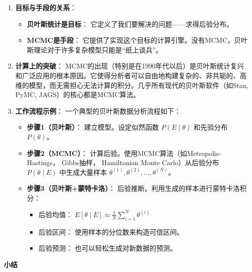 \documentclass[
]{book}
\providecommand{\tightlist}{%
  \setlength{\itemsep}{0pt}\setlength{\parskip}{0pt}}
\begin{document}
\begin{enumerate}
\def\labelenumi{\arabic{enumi}.}
\item
  \textbf{目标与手段的关系}：

  \begin{itemize}
  \tightlist
  \item
    \textbf{贝叶斯统计是目标}： 它定义了我们要解决的问题------求得后验分布。
  \item
    \textbf{MCMC是手段}： 它提供了实现这个目标的计算引擎。没有MCMC，贝叶斯理论对于许多复杂模型只能是``纸上谈兵''。
  \end{itemize}
\item
  \textbf{计算上的突破}：
  MCMC的出现（特别是在1990年代以后）是贝叶斯统计复兴和广泛应用的根本原因。它使得分析者可以自由地构建复杂的、非共轭的、高维的模型，而无需担心无法计算的积分。几乎所有现代的贝叶斯软件（如Stan, PyMC, JAGS）的核心都是MCMC算法。
\item
  \textbf{工作流程示例}：
  一个典型的贝叶斯数据分析流程如下：

  \begin{itemize}
  \tightlist
  \item
    \textbf{步骤1（贝叶斯）}： 建立模型。设定似然函数 \(P(E \mid \theta)\) 和先验分布 \(P(\theta)\)。
  \item
    \textbf{步骤2（MCMC）}： 计算后验。使用MCMC算法（如Metropolis-Hastings， Gibbs抽样， Hamiltonian Monte Carlo）从后验分布 \(P(\theta \mid E)\) 中生成大量样本 \(\theta^{(1)}, \theta^{(2)}, ..., \theta^{(N)}\)。
  \item
    \textbf{步骤3（贝叶斯+蒙特卡洛）}： 后验推断。利用生成的样本进行蒙特卡洛积分：

    \begin{itemize}
    \tightlist
    \item
      后验均值： \(E[\theta \mid E] \approx \frac{1}{N} \sum_{i=1}^N \theta^{(i)}\)
    \item
      后验区间： 使用样本的分位数来构造可信区间。
    \item
      后验预测： 也可以轻松生成对新数据的预测。
    \end{itemize}
  \end{itemize}
\end{enumerate}

\textbf{小结}
\end{document}
